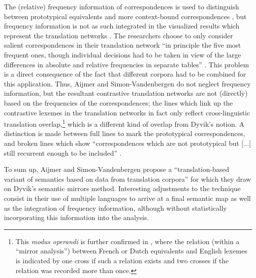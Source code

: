 The (relative) frequency information of correspondences is used to distinguish between prototypical equivalents and more context-bound correspondences \citep[8]{simon-vandenbergen_semantic_2007}, but frequency information is not as such integrated in the visualized results which represent the translation networks \citep[250--253]{simon-vandenbergen_semantic_2007}. The researchers choose to only consider salient correspondences in their translation network “in principle the five most frequent ones, though individual decisions had to be taken in view of the large differences in absolute and relative frequencies in separate tables” \citep[248]{simon-vandenbergen_semantic_2007}. This problem is a direct consequence of the fact that different corpora had to be combined for this application. Thus, Aijmer and Simon-Vandenbergen do not neglect frequency information, but the resultant contrastive translation networks are not (directly) based on the frequencies of the correspondences; the lines which link up the contrastive lexemes in the translation networks in fact only reflect cross-linguistic translation overlap,\footnote{This \textit{modus operandi} is further confirmed in \citet[93--94]{simon-vandenbergen_english_2013}, where the relation (within a ``mirror analysis'') between French or Dutch equivalents and English lexemes is indicated by one cross if such a relation exists and two crosses if the relation was recorded more than once.} which is a different kind of overlap from Dyvik’s notion. A distinction is made between full lines to mark the prototypical correspondences, and broken lines which show “correspondences which are not prototypical but [...] still recurrent enough to be included” \citep[248]{simon-vandenbergen_semantic_2007}.

To sum up, Aijmer and Simon-Vandenbergen propose a “translation-based variant of semantics based on data from translation corpora” \citep[7]{simon-vandenbergen_semantic_2007} for which they draw on Dyvik’s semantic mirrors method. Interesting adjustments to the technique consist in their use of multiple languages to arrive at a final semantic map as well as the integration of frequency information, although without statistically incorporating this information into the analysis.

